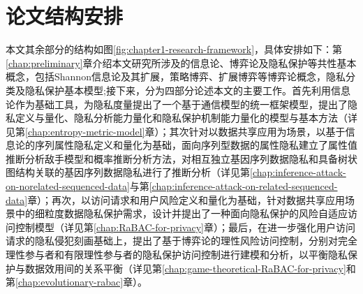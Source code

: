 \section{论文结构安排}

本文其余部分的结构如图\ref{fig:chapter1-research-framework}，具体安排如下：第\ref{chap:preliminary}章介绍本文研究所涉及的信息论、博弈论及隐私保护等共性基本概念，包括Shannon信息论及其扩展，策略博弈、扩展博弈等博弈论概念，隐私分类及隐私保护基本模型;接下来，分为四部分论述本文的主要工作。首先利用信息论作为基础工具，为隐私度量提出了一个基于通信模型的统一框架模型，提出了隐私定义与量化、隐私分析能力量化和隐私保护机制能力量化的模型与基本方法（详见第\ref{chap:entropy-metric-model}章）；其次针对以数据共享应用为场景，以基于信息论的序列属性隐私定义和量化为基础，面向序列型数据的属性隐私建立了属性值推断分析敌手模型和概率推断分析方法，对相互独立基因序列数据隐私和具备树状图结构关联的基因序列数据隐私进行了推断分析（详见第\ref{chap:inference-attack-on-norelated-sequenced-data}与第\ref{chap:inference-attack-on-related-sequenced-data}章）；再次，以访问请求和用户风险定义和量化为基础，针对数据共享应用场景中的细粒度数据隐私保护需求，设计并提出了一种面向隐私保护的风险自适应访问控制模型（详见第\ref{chap:RaBAC-for-privacy}章）；最后，在进一步强化用户访问请求的隐私侵犯刻画基础上，提出了基于博弈论的理性风险访问控制，分别对完全理性参与者和有限理性参与者的隐私保护访问控制进行建模和分析，以平衡隐私保护与数据效用间的关系平衡（详见第\ref{chap:game-theoretical-RaBAC-for-privacy}和第\ref{chap:evolutionary-rabac}章）。
